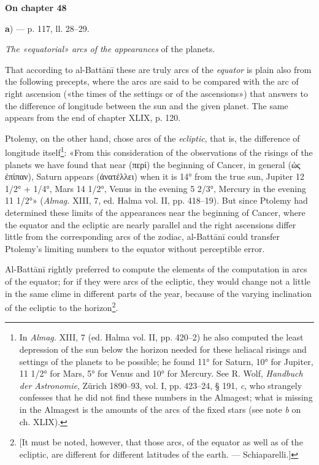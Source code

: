 \documentclass[11pt]{article}
\newcommand{\Pg}[1]{\marginpar{\footnotesize\color{gray}#1}}
\newcommand{\UnitHead}[2]{\par\setcounter{footnoteT}{0}\needspace{8\baselineskip}\bigskip\pdfbookmark[1]{#1}{unit-#2}\hypertarget{EN-#2}{}%
 {\large\bfseries\interlinepenalty=10000 #1\par}\nobreak\medskip}
\begin{document}
\UnitHead{On chapter 48}{A48}
\par\begin{center}\textbf{a}) — p. 117, ll. 28–29.\end{center}
\par \emph{The «equatorial» arcs of the appearances} of the planets.\par
\par That according to al-Battānī these are truly arcs of the \emph{equator} is plain also from the following precepts, where the arcs are said to be compared with the arc of right ascension («the times of the settings or of the ascensions») that answers to the difference of longitude between the sun and the given planet. The same appears from the end of chapter XLIX, p. 120.\par
\par Ptolemy, on the other hand, chose arcs of the \emph{ecliptic}, that is, the difference of longitude itself\footnote{In \emph{Almag.} XIII, 7 (ed. Halma vol. II, pp. 420–2) he also computed the least depression of the sun below the horizon needed for these heliacal risings and settings of the planets to be possible; he found 11° for Saturn, 10° for Jupiter, 11 1/2° for Mars, 5° for Venus and 10° for Mercury. See R. Wolf, \emph{Handbuch der Astronomie}, Zürich 1890–93, vol. I, pp. 423–24, § 191, \emph{c}, who strangely confesses that he did not find these numbers in the Almagest; what is missing in the Almagest is the amounts of the arcs of the fixed stars (see note \emph{b} on ch. XLIX).}: «From this consideration of the observations of the risings of the planets we have found that near ({\greekfont περί}) the beginning of Cancer, in general ({\greekfont ὡς ἐπίπαν}), Saturn appears ({\greekfont ἀνατέλλει}) when it is 14° from the true sun, Jupiter 12 1/2° + 1/4°, Mars 14 1/2°, Venus in the evening 5 2/3°, Mercury in the evening 11 1/2°» (\emph{Almag.} XIII, 7, ed. Halma vol. II, pp. 418–19). But since Ptolemy had determined these limits of the appearances near the beginning of Cancer, where the equator and the ecliptic are nearly parallel and the right ascensions differ little from the corresponding arcs of the zodiac, al-Battānī could transfer Ptolemy's limiting numbers to the equator without perceptible error.\par
\par \Pg{I 284}Al-Battānī rightly preferred to compute the elements of the computation in arcs of the equator; for if they were arcs of the ecliptic, they would change not a little in the same clime in different parts of the year, because of the varying inclination of the ecliptic to the horizon\footnote{[It must be noted, however, that those arcs, of the equator as well as of the ecliptic, are different for different latitudes of the earth. — Schiaparelli.]}.\par
\end{document}
